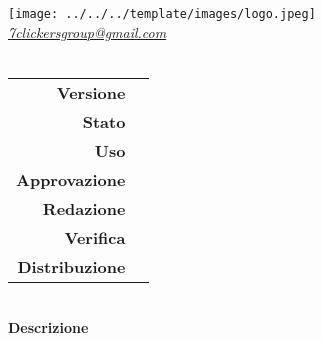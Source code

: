 \thispagestyle{empty}
\renewcommand{\arraystretch}{1.3}

\begin{titlepage}
	\begin{center}
		
	\texttt{[image: ../../../template/images/logo.jpeg]}
	\\[1cm]
	\href{mailto:7clickersgroup@gmail.com}		      	
	{\large{\textit{7clickersgroup@gmail.com} } }\\[2.5cm]
	\Huge \textbf{\doctitle} \\[1cm]
	 \large
			 \begin{tabular}{r|l}
                        \textbf{Versione} & \rev{} \\
                        \textbf{Stato} & \stato{} \\
                        \textbf{Uso} & \uso{} \\                         
                        \textbf{Approvazione} & \approv{} \\                      
                        \textbf{Redazione} & \red{} \\ 
                        \textbf{Verifica} &  \ver{} \\                         
                        \textbf{Distribuzione} & \parbox[t]{5cm}{ \dest{} }
                \end{tabular} 
                \\[3.3cm]
                \large \textbf{Descrizione} \\ \describedoc{} 
     \end{center}
\end{titlepage}